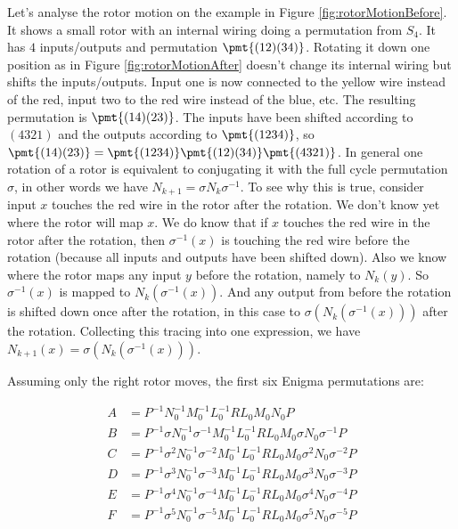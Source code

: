 Let's analyse the rotor motion on the example in Figure \ref{fig:rotorMotionBefore}. It shows a small rotor with an internal wiring doing a permutation from $S_4$. It has $4$ inputs/outputs and permutation $\pmt{(12)(34)}$. Rotating it down one position as in Figure \ref{fig:rotorMotionAfter} doesn't change its internal wiring but shifts the inputs/outputs. Input one is now connected to the yellow wire instead of the red, input two to the red wire instead of the blue, etc. The resulting permutation is $\pmt{(14)(23)}$. The inputs have been shifted according to $(4321)$ and the outputs according to $\pmt{(1234)}$, so $\pmt{(14)(23)}=\pmt{(1234)} \pmt{(12)(34)}  \pmt{(4321)}$. In general one rotation of a rotor is equivalent to conjugating it with the full cycle permutation $\sigma$, in other words we have $N_{k+1}=\sigma N_k \sigma^{-1}$. To see why this is true, consider input $x$ touches the red wire in the rotor after the rotation. We don't know yet where the rotor will map $x$. We do know that if $x$ touches the red wire in the rotor after the rotation, then $\sigma^{-1}(x)$ is touching the red wire before the rotation (because all inputs and outputs have been shifted down). Also we know where the rotor maps any input $y$ before the rotation, namely to $N_k(y)$. So $\sigma^{-1}(x)$ is mapped to $N_k(\sigma^{-1}(x))$. And any output from before the rotation is shifted down once after the rotation, in this case to $\sigma(N_k(\sigma^{-1}(x)))$ after the rotation. Collecting this tracing into one expression, we have $N_{k+1}(x) = \sigma(N_k(\sigma^{-1}(x)))$.

Assuming only the right rotor moves, the first six Enigma permutations are:

\begin{equation} \label{sixEnigma1}
\begin{split}
A &= P^{-1} N_0^{-1} M_0^{-1} L_0^{-1} R L_0 M_0 N_0 P \\
B &= P^{-1} \sigma N_0^{-1} \sigma^{-1} M_0^{-1} L_0^{-1} R L_0 M_0 \sigma N_0 \sigma^{-1} P \\
C &= P^{-1} \sigma^{2} N_0^{-1} \sigma^{-2} M_0^{-1} L_0^{-1} R L_0 M_0 \sigma^{2} N_0 \sigma^{-2} P \\
D &= P^{-1} \sigma^{3} N_0^{-1} \sigma^{-3} M_0^{-1} L_0^{-1} R L_0 M_0 \sigma^{3} N_0 \sigma^{-3} P \\
E &= P^{-1} \sigma^{4} N_0^{-1} \sigma^{-4} M_0^{-1} L_0^{-1} R L_0 M_0 \sigma^{4} N_0 \sigma^{-4} P \\
F &= P^{-1} \sigma^{5} N_0^{-1} \sigma^{-5} M_0^{-1} L_0^{-1} R L_0 M_0 \sigma^{5} N_0 \sigma^{-5} P 
\end{split}
\end{equation}

